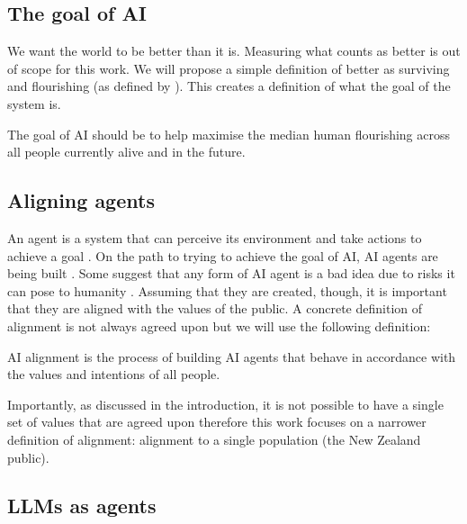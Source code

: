 \subsection{The goal of AI}
We want the world to be better than it is. Measuring what counts as better is out of scope for this work. We will propose a simple definition of better as surviving and flourishing (as defined by \cite{vanderweelePromotionHumanFlourishing2017}). This creates a definition of what the goal of the system is.

\begin{definition}
The goal of AI should be to help maximise the median human flourishing across all people currently alive and in the future.
\end{definition}

\subsection{Aligning agents}
\label{subsec:aligning-agents}

An agent is a system that can perceive its environment and take actions to achieve a goal \cite{russellArtificialIntelligenceGlobal2021,suttonReinforcementLearningSecond2018a}. On the path to trying to achieve the goal of AI, AI agents are being built \cite{chanHarmsIncreasinglyAgentic2023}. Some suggest that any form of AI agent is a bad idea due to risks it can pose to humanity \cite{bengioSuperintelligentAgentsPose2025}. Assuming that they are created, though, it is important that they are aligned with the values of the public. A concrete definition of alignment is not always agreed upon \cite{kirkEmptySignifierProblem2023,gabrielArtificialIntelligenceValues2020} but we will use the following definition:

\begin{definition}[AI alignment]
AI alignment is the process of building AI agents that behave in accordance with the values and intentions of all people.
\end{definition}

Importantly, as discussed in the introduction, it is not possible to have a single set of values that are agreed upon \cite{santurkarWhoseOpinionsLanguage2023,fengModularPluralismPluralistic2024} therefore this work focuses on a narrower definition of alignment: alignment to a single population (the New Zealand public).


\subsection{LLMs as agents}

